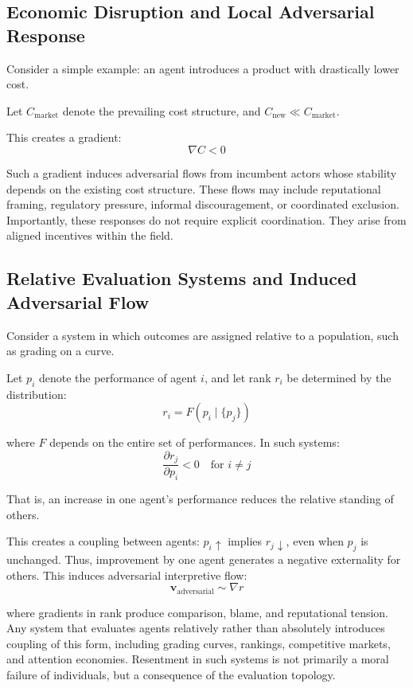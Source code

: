 \documentclass[12pt,a4paper]{article}
\begin{document}
\subsection{Economic Disruption and Local Adversarial Response}

Consider a simple example: an agent introduces a product with drastically lower cost.

Let $C_{\text{market}}$ denote the prevailing cost structure, and $C_{\text{new}} \ll C_{\text{market}}$.

This creates a gradient:
\[
\nabla C < 0
\]

Such a gradient induces adversarial flows from incumbent actors whose stability depends on the existing cost structure. These flows may include reputational framing, regulatory pressure, informal discouragement, or coordinated exclusion. Importantly, these responses do not require explicit coordination. They arise from aligned incentives within the field.

\subsection{Relative Evaluation Systems and Induced Adversarial Flow}

Consider a system in which outcomes are assigned relative to a population, such as grading on a curve.

Let $p_i$ denote the performance of agent $i$, and let rank $r_i$ be determined by the distribution:
\[
r_i = F(p_i \mid \{p_j\})
\]

where $F$ depends on the entire set of performances. In such systems:
\[
\frac{\partial r_j}{\partial p_i} < 0 \quad \text{for } i \neq j
\]

That is, an increase in one agent's performance reduces the relative standing of others.

This creates a coupling between agents: $p_i \uparrow$ implies $r_j \downarrow$, even when $p_j$ is unchanged. Thus, improvement by one agent generates a negative externality for others. This induces adversarial interpretive flow:
\[
\mathbf{v}_{\text{adversarial}} \sim \nabla r
\]

where gradients in rank produce comparison, blame, and reputational tension. Any system that evaluates agents relatively rather than absolutely introduces coupling of this form, including grading curves, rankings, competitive markets, and attention economies. Resentment in such systems is not primarily a moral failure of individuals, but a consequence of the evaluation topology.
\end{document}
